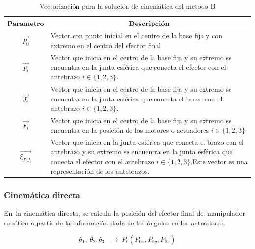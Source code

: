             \begingroup
            \renewcommand{\arraystretch}{1.5}
            \begin{table}[H]
            \centering
            \begin{tabular}{c m{12cm}}
               \hline
               \textbf{Parametro}  & \multicolumn{1}{c}{\textbf{Descripción}}  \\
               \hline           \hline            
             $\overrightarrow{{P}_{0}}$ & Vector con punto inicial en el centro de la base fija y con extremo en el centro del efector final \\
            \hline
             $\overrightarrow{{P}_{i}}$ & Vector que inicia en el centro de la base fija y su extremo se encuentra en la junta esférica que conecta el efector con el antebrazo $i\in\{1,2,3\}$. \\
            \hline
             $\overrightarrow{{J}_{i}}$ & Vector que inicia en el centro de la base fija y su extremo se encuentra en la junta esférica que conecta el brazo con el antebrazo $i\in\{1,2,3\}$. \\
            \hline
             $\overrightarrow{{F}_{i}}$ & Vector que inicia en el centro de la base fija y su extremo se encuentra en la posición de los motores o actuadores $i\in\{1,2,3\}$ \\
            \hline
             $\overrightarrow{{\xi}_{F_iJ_i}}$ & Vector que inicia en la junta esférica que conecta el brazo con el antebrazo y su extremo se encuentra en la junta esférica que conecta el efector con el antebrazo $i\in\{1,2,3\}$.Este vector es una representación de los antebrazos.
 \\
            \hline
            \end{tabular}
            \caption{Vectorización para la solución de cinemática del metodo B}
           \label{tab:cap4_tabla_1332}
        \end{table}
        \endgroup     
        
        \newpage


\subsubsection{Cinemática directa}\label{mb_cd}
        
        En\ la cinemática directa, se calcula la posición del efector final del manipulador robótico a partir de la información dada de los ángulos en los actuadores.


        \begin{equation}
            \theta _{1},~ \theta _{2}, \theta _{3}~~~ \rightarrow ~  {P_{0}} \left( P_{0x},P_{0y},P_{0z} \right)
        \label{eq:cap4_MB_1}
        \end{equation}

